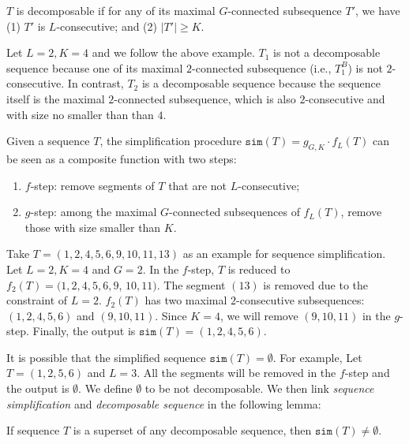 \begin{definition}
$T$ is decomposable if for any of its maximal $G$-connected subsequence $T'$, we have (1) $T'$ is $L$-consecutive; and (2) $|T'|\geq K$.
\end{definition}

\begin{example}
Let $L = 2, K = 4$ and we follow the above example. $T_1$ is not a decomposable sequence
because one of its maximal $2$-connected subsequence (i.e., $T_1^B$) is not $2$-consecutive.
In contrast, $T_2$ is a decomposable sequence because the sequence itself is the maximal $2$-connected subsequence, which is also $2$-consecutive and with size no smaller than than $4$.
\end{example}

\begin{definition}
Given a sequence $T$, the simplification procedure $\mathtt{sim}(T) =  g_{G,K} \cdot f_L(T) $ can be seen as a composite function with two steps: 
\begin{enumerate}
\item $f$-step: remove segments of $T$ that are not $L$-consecutive;
\item $g$-step: among the maximal $G$-connected subsequences of $f_L(T)$, remove those with size smaller than $K$.
\end{enumerate}
\end{definition}


\begin{example}
Take $T=(1,2,4,5,6,9,10,11,13)$ as an example for sequence simplification. 
Let $L = 2, K = 4$ and $G = 2$. In the $f$-step, $T$ is reduced to $f_2(T)=(1,2,4,5,6,9$, $10,11)$. 
The segment $(13)$ is removed due to the constraint of $L=2$. 
$f_2(T)$ has two maximal $2$-consecutive subsequences: $(1,2,4,5,6)$ and $(9,10,11)$. 
Since $K=4$, we will remove $(9,10,11)$ in the $g$-step. Finally, the output is $\mathtt{sim}(T)=(1,2,4,5,6)$.
\end{example}

It is possible that the simplified sequence $\mathtt{sim}(T)=\emptyset$. For example, Let $T=(1,2,5,6)$ 
and $L=3$. All the segments will be removed in the $f$-step and the output is $\emptyset$.
We define $\emptyset$ to be not decomposable. 
We then link \emph{sequence simplification} and \emph{decomposable sequence} in the following lemma:
\begin{lemma}\label{lemma:decom-sim}
If sequence $T$ is a superset of any decomposable sequence, then $\mathtt{sim}(T) \neq \emptyset$.
\end{lemma}

